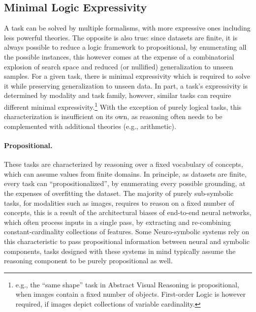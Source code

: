 \subsection{Minimal Logic Expressivity}
A task can be solved by multiple formalisms, with more expressive ones including less powerful theories. The opposite is also true: since datasets are finite, it is always possible to reduce a logic framework to propositional, by enumerating all the possible instances, this however comes at the expense of a combinatorial explosion of search space and reduced (or nullified) generalization to unseen samples.
%
For a given task, there is minimal expressivity which is required to solve it while preserving generalization to unseen data.
%
%
%
In part, a task's expressivity is determined by modality and task family, however, similar tasks can require different minimal expressivity.\footnote{e.g., the ``same shape'' task in Abstract Visual Reasoning is propositional, when images contain a fixed number of objects. First-order Logic is however required, if images depict collections of variable cardinality.}
With the exception of purely logical tasks, this characterization is insufficient on its own, as reasoning often needs to be complemented with additional theories (e.g., arithmetic).

\paragraph{Propositional.} These tasks are characterized by reasoning over a fixed vocabulary of concepts, which can assume values from finite domains. In principle, as datasets are finite, every task can ``propositionalized'', by enumerating every possible grounding, at the expenses of overfitting the dataset.
The majority of purely sub-symbolic tasks, for modalities such as images, requires to reason on a fixed number of concepts, this is a result of the architectural biases of end-to-end neural networks, which often process inputs in a single pass, by extracting and re-combining constant-cardinality collections of features. Some Neuro-symbolic systems rely on this characteristic to pass propositional information between neural and symbolic components, tasks designed with these systems in mind typically assume the reasoning component to be purely propositional as well.%

